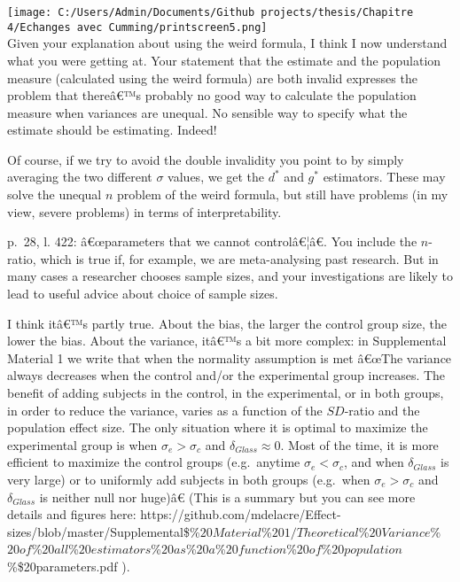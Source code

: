 \begin{appendix}
\texttt{[image: C:/Users/Admin/Documents/Github projects/thesis/Chapitre 4/Echanges avec Cumming/printscreen5.png]}\\
\color{brown} Given your explanation about using the weird formula, I
think I now understand what you were getting at. Your statement that the
estimate and the population measure (calculated using the weird formula)
are both invalid expresses the problem that thereâ€™s probably no good
way to calculate the population measure when variances are unequal. No
sensible way to specify what the estimate should be estimating. Indeed!

Of course, if we try to avoid the double invalidity you point to by
simply averaging the two different \(\sigma\) values, we get the \(d^*\)
and \(g^*\) estimators. These may solve the unequal \(n\) problem of the
weird formula, but still have problems (in my view, severe problems) in
terms of interpretability.

\color{black} p.~28, l. 422: â€œparameters that we cannot controlâ€¦â€.
You include the \(n\)-ratio, which is true if, for example, we are
meta-analysing past research. But in many cases a researcher chooses
sample sizes, and your investigations are likely to lead to useful
advice about choice of sample sizes.

\color{blue} I think itâ€™s partly true. About the bias, the larger the
control group size, the lower the bias. About the variance, itâ€™s a bit
more complex: in Supplemental Material 1 we write that when the
normality assumption is met â€œThe variance always decreases when the
control and/or the experimental group increases. The benefit of adding
subjects in the control, in the experimental, or in both groups, in
order to reduce the variance, varies as a function of the \(SD\)-ratio
and the population effect size. The only situation where it is optimal
to maximize the experimental group is when \(\sigma_e>\sigma_c\) and
\(\delta_{Glass}\approx 0\). Most of the time, it is more efficient to
maximize the control groups (e.g.~anytime \(\sigma_e<\sigma_c\), and
when \(\delta_{Glass}\) is very large) or to uniformly add subjects in
both groups (e.g.~when \(\sigma_e>\sigma_c\) and \(\delta_{Glass}\) is
neither null nor huge)â€ (This is a summary but you can see more
details and figures here:
https://github.com/mdelacre/Effect-sizes/blob/master/Supplemental\$\%\(20Material\)\%\(201/Theoretical\)\%\(20Variance\)\%\(20of\)\%\(20all\)\%\(20estimators\)\%\(20as\)\%\(20a\)\%\(20function\)\%\(20of\)\%\(20population\)\%\$20parameters.pdf
).


\end{appendix}
